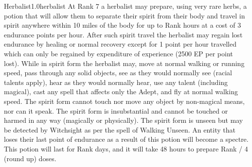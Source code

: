 \begin{skill}{Herbalist}{1.0}{herbalist}
At Rank 7 a herbalist may prepare, using very rare herbs, a potion
that will allow them to separate their spirit from their body and
travel in spirit anywhere within 10 miles of the body for up to Rank
hours at a cost of 3 endurance points per hour. After such spirit
travel the herbalist may regain lost endurance by healing or normal
recovery except for 1 point per hour travelled which can only be
regained by expenditure of experience (2500 EP per point lost).  While
in spirit form the herbalist may, move at normal walking or running
speed, pass through any solid objects, see as they would normally see
(\ie racial talents apply), hear as they would normally hear, use
any talent (including magical), cast any spell that affects only the
Adept, and fly at normal walking speed. The spirit form cannot touch
nor move any object by non-magical means, nor can it speak. The spirit
form is insubstantial and cannot be touched or harmed in any way
(magically or physically).  The spirit form is unseen but may be
detected by Witchsight as per the spell of Walking Unseen.  An entity
that loses their last point of endurance as a result of this potion
will become a spectre.  This potion will last for Rank  days, and
it will take 48 hours to prepare Rank / 4 (round up) doses.

\end{skill}
